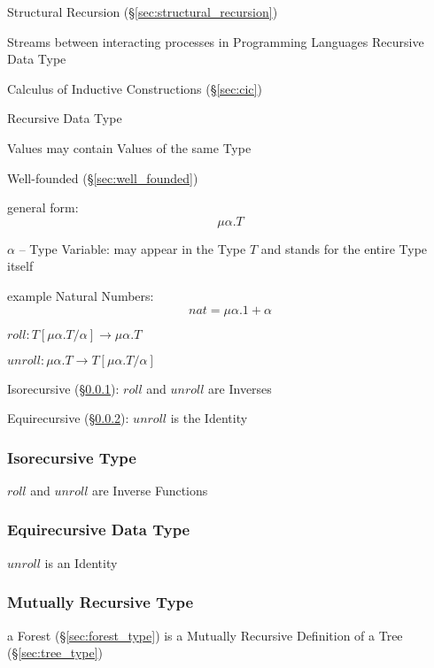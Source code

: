 Structural Recursion (\S\ref{sec:structural_recursion})

Streams between interacting processes in Programming Languages
Recursive Data Type

Calculus of Inductive Constructions (\S\ref{sec:cic})


\asterism

Recursive Data Type

Values may contain Values of the same Type

Well-founded (\S\ref{sec:well_founded})

general form:
\[
  \mu\alpha.T
\]

$\alpha$ -- Type Variable: may appear in the Type $T$ and stands for
the entire Type itself

example Natural Numbers:
\[
  nat = \mu\alpha.1 + \alpha
\]

$roll : T[\mu\alpha.T/\alpha] \rightarrow \mu\alpha.T$

$unroll : \mu\alpha.T \rightarrow T[\mu\alpha.T/\alpha]$

Isorecursive (\S\ref{sec:isorecursive_type}): $roll$ and $unroll$
are Inverses

Equirecursive (\S\ref{sec:equirecursive_type}): $unroll$ is the
Identity



\subsubsection{Isorecursive Type}\label{sec:isorecursive_type}

$roll$ and $unroll$ are Inverse Functions



\subsubsection{Equirecursive Data Type}\label{sec:equirecursive_type}

$unroll$ is an Identity



\subsubsection{Mutually Recursive Type}
\label{sec:mutually_recursive}\hfill

a Forest (\S\ref{sec:forest_type}) is a Mutually Recursive Definition
of a Tree (\S\ref{sec:tree_type})



